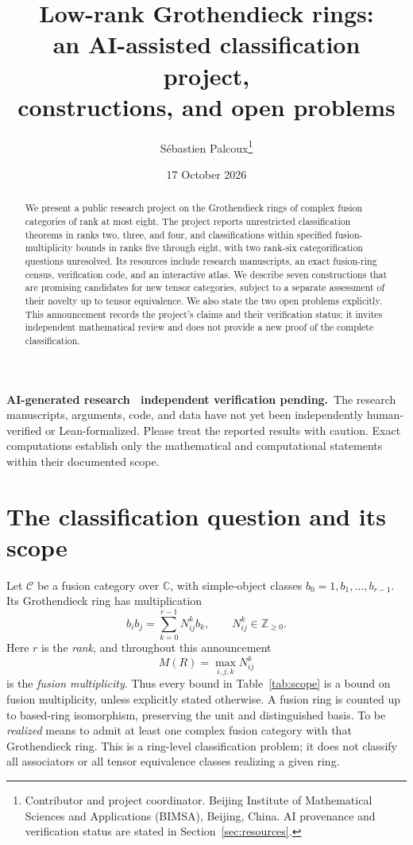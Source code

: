 \documentclass[11pt,a4paper]{article}
\title{\vspace{-12mm}\textbf{Low-rank Grothendieck rings:}\\[3pt]
an AI-assisted classification project,\\ constructions, and open problems}
\author{S\'ebastien Palcoux\thanks{Contributor and project coordinator. Beijing Institute of Mathematical Sciences and Applications (BIMSA), Beijing, China. AI provenance and verification status are stated in Section~\ref{sec:resources}.}}
\date{17 October 2026}
\newcommand{\caution}{\textbf{AI-generated research \textperiodcentered\ independent verification pending.}}
\begin{document}
\maketitle
\vspace{-5mm}
\begin{abstract}
We present a public research project on the Grothendieck rings of complex
fusion categories of rank at most eight. The project reports unrestricted
classification theorems in ranks two, three, and four, and classifications
within specified fusion-multiplicity bounds in ranks five through eight,
with two rank-six categorification questions unresolved. Its resources
include research manuscripts, an exact fusion-ring census, verification
code, and an interactive atlas. We describe seven constructions that are
promising candidates for new tensor categories, subject to a separate
assessment of their novelty up to tensor equivalence. We also state the
two open problems explicitly. This announcement records the project's
claims and their verification status; it invites independent mathematical
review and does not provide a new proof of the complete classification.
\end{abstract}

\begingroup\small
\caution\ The research manuscripts, arguments, code, and data have not yet
been independently human-verified or Lean-formalized. Please treat the
reported results with caution. Exact computations establish only the
mathematical and computational statements within their documented scope.
\endgroup

\section{The classification question and its scope}
Let $\mathcal C$ be a fusion category over $\mathbb C$, with simple-object
classes $b_0=1,b_1,\ldots,b_{r-1}$. Its Grothendieck ring has multiplication
\[
 b_i b_j=\sum_{k=0}^{r-1}N_{ij}^{k}b_k,
 \qquad N_{ij}^{k}\in\mathbb Z_{\geq0}.
\]
Here $r$ is the \emph{rank}, and throughout this announcement
\[
 M(R)=\max_{i,j,k}N_{ij}^{k}
\]
is the \emph{fusion multiplicity}. Thus every bound in Table~\ref{tab:scope}
is a bound on fusion multiplicity, unless explicitly stated otherwise.
A fusion ring is counted up to based-ring isomorphism, preserving the unit
and distinguished basis. To be \emph{realized} means to admit at least one
complex fusion category with that Grothendieck ring. This is a ring-level
classification problem; it does not classify all associators or all tensor
equivalence classes realizing a given ring.
\end{document}
